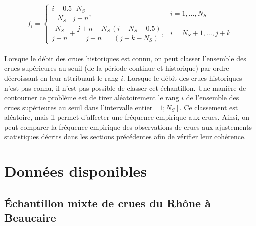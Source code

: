 		\begin{equation}	
		f_i = \begin{cases}\dfrac{i-0.5}{N_S} \dfrac{N_S}{j+n}, & i=1, \ldots, N_S \\ \dfrac{N_S}{j+n}+\dfrac{j+n-N_S}{j+n} \dfrac{(i-N_S-0.5)}{(j+k-N_S)}, & i=N_S+1, \ldots, j+k\end{cases}
		\label{eq:FreqHisto}	
		\end{equation}
%	
%		
	
	\paragraph{} Lorsque le débit des crues historiques est connu, on peut classer l'ensemble des crues supérieures au seuil (de la période continue et historique) par ordre décroissant en leur attribuant le rang $i$. Lorsque le débit des crues historiques n'est pas connu, il n'est pas possible de classer cet échantillon. Une manière de contourner ce problème est de tirer aléatoirement le rang $i$ de l'ensemble des crues supérieures au seuil dans l'intervalle entier $\left[1;N_S\right]$. Ce classement est aléatoire, mais il permet d'affecter une fréquence empirique aux crues. Ainsi, on peut comparer la fréquence empirique des observations de crues aux ajustements statistiques décrits dans les sections précédentes afin de vérifier leur cohérence. 
		
		
\section{Données disponibles}
\label{sec:dataBcr}

	\subsection{Échantillon mixte de crues du Rhône à Beaucaire}
